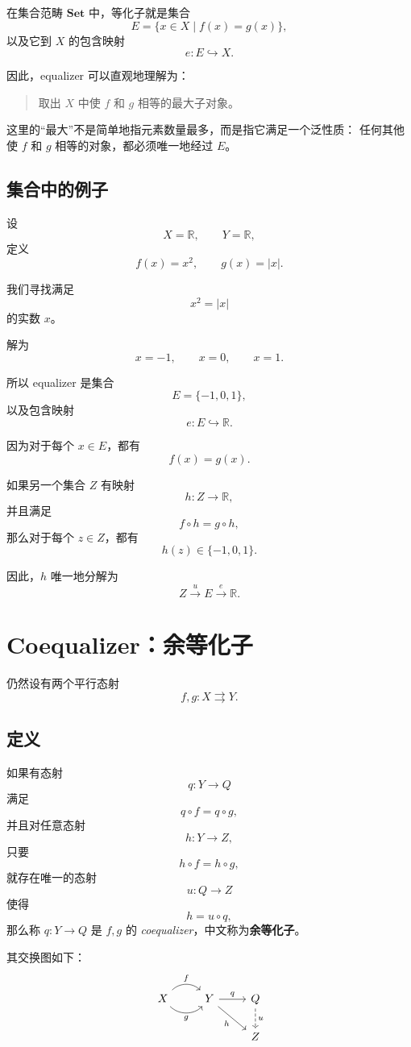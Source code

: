 \documentclass[UTF8, a4paper, 12pt]{ctexart}
\newcommand{\Set}{\mathbf{Set}}
\begin{document}
在集合范畴 \(\Set\) 中，等化子就是集合
\[
E=\{x\in X\mid f(x)=g(x)\},
\]
以及它到 \(X\) 的包含映射
\[
e\colon E\hookrightarrow X.
\]

因此，equalizer 可以直观地理解为：

\begin{quote}
取出 \(X\) 中使 \(f\) 和 \(g\) 相等的最大子对象。
\end{quote}

这里的“最大”不是简单地指元素数量最多，而是指它满足一个泛性质：
任何其他使 \(f\) 和 \(g\) 相等的对象，都必须唯一地经过 \(E\)。

\subsection{集合中的例子}

设
\[
X=\mathbb{R},\qquad Y=\mathbb{R},
\]
定义
\[
f(x)=x^2,\qquad g(x)=|x|.
\]

我们寻找满足
\[
x^2=|x|
\]
的实数 \(x\)。

解为
\[
x=-1,\qquad x=0,\qquad x=1.
\]

所以 equalizer 是集合
\[
E=\{-1,0,1\},
\]
以及包含映射
\[
e\colon E\hookrightarrow \mathbb{R}.
\]

因为对于每个 \(x\in E\)，都有
\[
f(x)=g(x).
\]

如果另一个集合 \(Z\) 有映射
\[
h\colon Z\to\mathbb{R},
\]
并且满足
\[
f\circ h=g\circ h,
\]
那么对于每个 \(z\in Z\)，都有
\[
h(z)\in\{-1,0,1\}.
\]

因此，\(h\) 唯一地分解为
\[
Z\xrightarrow{u}E\xrightarrow{e}\mathbb{R}.
\]

\section{Coequalizer：余等化子}

仍然设有两个平行态射
\[
f,g\colon X\rightrightarrows Y.
\]

\subsection{定义}

如果有态射
\[
q\colon Y\to Q
\]
满足
\[
q\circ f=q\circ g,
\]
并且对任意态射
\[
h\colon Y\to Z,
\]
只要
\[
h\circ f=h\circ g,
\]
就存在唯一的态射
\[
u\colon Q\to Z
\]
使得
\[
h=u\circ q,
\]
那么称 \(q\colon Y\to Q\) 是 \(f,g\) 的
\emph{coequalizer}，中文称为\textbf{余等化子}。

其交换图如下：
\[
\begin{tikzcd}
X
    \arrow[r, bend left=45, "f"]
    \arrow[r, bend right=45, swap, "g"]
&
Y
    \arrow[r, "q"]
    \arrow[dr, "h"']
&
Q
    \arrow[d, "u", dashed]
\\
&& Z
\end{tikzcd}
\]
\end{document}
